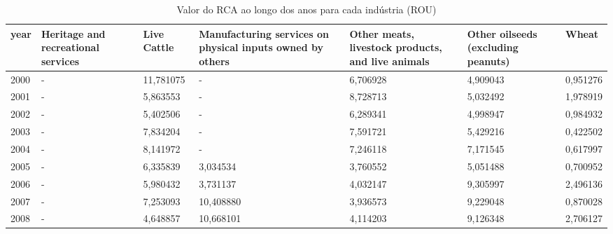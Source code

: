 \begin{table}
\centering
\caption{Valor do RCA ao longo dos anos para cada indústria (ROU)}
\begin{tabular}{p{1cm}p{2cm}p{2cm}p{2cm}p{2cm}p{2cm}p{2cm}}
\toprule
 year &  Heritage and recreational services &  Live Cattle &  Manufacturing services on physical inputs owned by others &  Other meats, livestock products, and live animals &  Other oilseeds (excluding peanuts) &    Wheat \\
\midrule
 2000 &                                   - &    11,781075 &                                                  - &                                           6,706928 &                            4,909043 & 0,951276 \\
 2001 &                                   - &     5,863553 &                                                  - &                                           8,728713 &                            5,032492 & 1,978919 \\
 2002 &                                   - &     5,402506 &                                                  - &                                           6,289341 &                            4,998947 & 0,984932 \\
 2003 &                                   - &     7,834204 &                                                  - &                                           7,591721 &                            5,429216 & 0,422502 \\
 2004 &                                   - &     8,141972 &                                                  - &                                           7,246118 &                            7,171545 & 0,617997 \\
 2005 &                                   - &     6,335839 &                                           3,034534 &                                           3,760552 &                            5,051488 & 0,700952 \\
 2006 &                                   - &     5,980432 &                                           3,731137 &                                           4,032147 &                            9,305997 & 2,496136 \\
 2007 &                                   - &     7,253093 &                                          10,408880 &                                           3,936573 &                            9,229048 & 0,870028 \\
 2008 &                                   - &     4,648857 &                                          10,668101 &                                           4,114203 &                            9,126348 & 2,706127 \\

\end{tabular}
\end{table}
